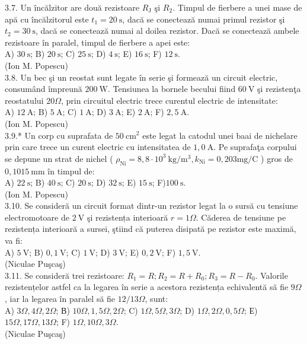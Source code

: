 \documentclass[10pt]{article}
\begin{document}
3.7. Un încălzitor are două rezistoare $R_{\mathrm{J}}$ şi $R_{2}$. Timpul de fierbere a unei mase de apă cu încălzitorul este $t_{1}=20 \mathrm{~s}$, dacă se conectează numai primul rezistor şi $t_{2}=30 \mathrm{~s}$, dacă se conectează numai al doilea rezistor. Dacă se conectează ambele rezistoare în paralel, timpul de fierbere a apei este:\\ A) $30 \mathrm{~s}$; B) $20 \mathrm{~s}$; C) $25 \mathrm{~s}$; D) $4 \mathrm{~s}$; E) $16 \mathrm{~s}$; F) $12 \mathrm{~s}$.\\ (Ion M. Popescu)\\

3.8. Un bec şi un reostat sunt legate în serie şi formează un circuit electric, consumând împreună $200 \mathrm{~W}$. Tensiunea la bornele becului fiind $60 \mathrm{~V}$ şi rezistenţa reostatului $20 \Omega$, prin circuitul electric trece curentul electric de intensitate:\\ A) $12 \mathrm{~A}$; B) $5 \mathrm{~A}$; C) $1 \mathrm{~A}$; D) $3 \mathrm{~A}$; E) $2 \mathrm{~A}$; F) $2,5 \mathrm{~A}$.\\ (Ion M. Popescu)\\

3.9.* Un corp cu suprafata de $50 \mathrm{~cm}^{2}$ este legat la catodul unei baai de nichelare prin care trece un curent electric cu intensitatea de $1,0 \mathrm{~A}$. Pe suprafaţa corpului se depune un strat de nichel ( $\rho_{\mathrm{Ni}}=8,8 \cdot 10^{3} \mathrm{~kg} / \mathrm{m}^{3}, k_{\mathrm{Ni}}=0,203 \mathrm{mg} / \mathrm{C}$ ) gros de $0,1015 \mathrm{~mm}$ în timpul de:\\ A) $22 \mathrm{~s}$; B) $40 \mathrm{~s}$; C) $20 \mathrm{~s}$; D) $32 \mathrm{~s}$; E) $15 \mathrm{~s}$; F)$100 \mathrm{~s}$.\\ (Ion M. Popescu)\\

3.10. Se consideră un circuit format dintr-un rezistor legat la o sursă cu tensiune electromotoare de $2 \mathrm{~V}$ şi rezistența interioară $r=1 \Omega$. Căderea de tensiune pe rezistența interioară a sursei, ştiind că puterea disipată pe rezistor este maximă, va fi:\\ A) $5 \mathrm{~V}$; B) $0,1 \mathrm{~V}$; C) $1 \mathrm{~V}$; D) $3 \mathrm{~V}$; E) $0,2 \mathrm{~V}$; F) $1,5 \mathrm{~V}$.\\ (Niculae Puşcaş)\\

3.11. Se consideră trei rezistoare: $R_{1}=R ; R_{2}=R+R_{0} ; R_{3}=R-R_{0}$. Valorile rezistențelor astfel ca la legarea în serie a acestora rezistența echivalentă să fie $9 \Omega$, iar la legarea în paralel să fie $12 / 13 \Omega$, sunt:\\ A) $3 \Omega , 4 \Omega , 2 \Omega$; В) $10 \Omega , 1,5 \Omega , 2 \Omega$; C) $1 \Omega , 5 \Omega , 3 \Omega$; D) $1 \Omega , 2 \Omega , 0,5 \Omega$; Е) $15 \Omega , 17 \Omega , 13 \Omega$; F) $1 \Omega , 10 \Omega , 3 \Omega$.\\ (Niculae Puşcaş)\\
\end{document}
